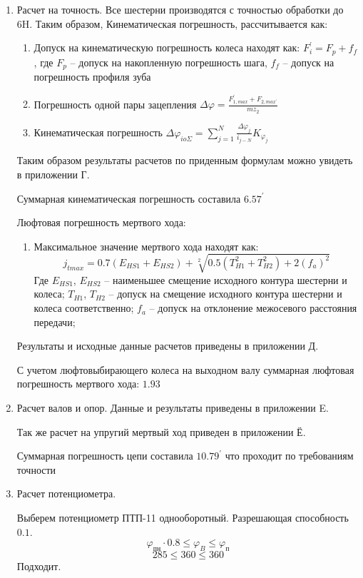 \documentclass{article}
\begin{document}
\begin{enumerate}
	\item Расчет на точность.
	Все шестерни производятся с точностью обработки до 6H. Таким образом, Кинематическая погрешность, рассчитывается как:
	\begin{enumerate}
		\item Допуск на кинематическую погрешность колеса находят как: $ F_{i}^{'} = F_p + f_f$, где $F_p$ -- допуск на накопленную погрешность шага, $f_f$ -- допуск на погрешность профиля зуба
		\item Погрешность одной пары зацепления $ \Delta \varphi = \frac{F_{1,max}^{'} + F_{2,max^{'}}}{m z_2} $
		\item Кинематическая погрешность $ \Delta \varphi_{io \Sigma} = \sum\limits_{j=1}^{N} { \frac{ \Delta \varphi_j}{i_{j-N}}} K_{\varphi_j}$
	\end{enumerate}
	Таким образом результаты расчетов по приденным формулам можно увидеть в приложении Г.
	
	Суммарная кинематическая погрешность составила $6.57^{'}$

	Люфтовая погрешность мертвого хода:
	\begin{enumerate}
		\item Максимальное значение мертвого хода находят как:
		$$
		j_{t max} = 0.7(E_{HS1} + E_{HS2}) + \sqrt[2]{0.5(T_{H1}^2 + T_{H2}^2) + 2 (f_a)^2}
		$$
		Где $E_{HS1}$, $E_{HS2}$ -- наименьшее смещение исходного контура шестерни и колеса; $T_{H1}$, $T_{H2}$ -- допуск на смещение исходного контура шестерни и колеса соответственно; $f_a$ -- допуск на отклонение межосевого расстояния передачи;
	\end{enumerate}
	Результаты и исходные данные расчетов приведены в приложении Д.

	С учетом люфтовыбирающего колеса на выходном валу суммарная люфтовая погрешность мертвого хода: $1.93$

	\item Расчет валов и опор.
	Данные и результаты приведены в приложении E.

	Так же расчет на упругий мертвый ход приведен в приложении Ё.

	Суммарная погрешность цепи составила $10.79^{'}$ что проходит по требованиям точности
	
	\item Расчет потенциометра.
	
	Выберем потенциометр ПТП-11 однооборотный. Разрешающая способность $0.1$.
	$$
	\varphi_{пн} \cdot 0.8 \le \varphi_{B} \le \varphi_{п}
	$$
	$$
	285 \le 360 \le 360
	$$
	Подходит.
\end{enumerate}
	
\end{document}
